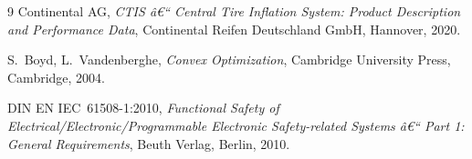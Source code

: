 ﻿\documentclass[a4paper,12pt]{article}
\theoremstyle{definition}
\begin{document}
\begin{thebibliography}{9}
Continental AG,
\textit{CTIS â€“ Central Tire Inflation System: Product Description and Performance Data},
Continental Reifen Deutschland GmbH, Hannover, 2020.

S.~Boyd, L.~Vandenberghe,
\textit{Convex Optimization},
Cambridge University Press, Cambridge, 2004.

DIN EN IEC~61508-1:2010,
\textit{Functional Safety of Electrical/Electronic/Programmable Electronic Safety-related
Systems â€“ Part 1: General Requirements},
Beuth Verlag, Berlin, 2010.
\end{thebibliography}
\end{document}
